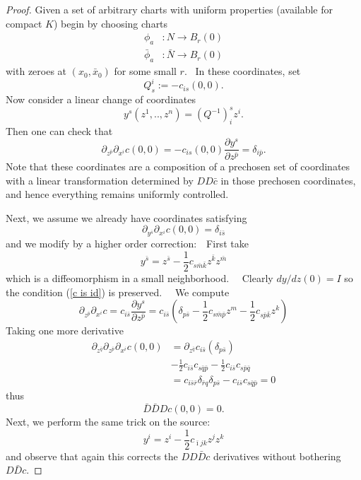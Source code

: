 \documentclass[12pt,letterpaper]{amsart}%
\numberwithin{mycounter}{section}
\theoremstyle{plain}
\numberwithin{equation}{section}
\theoremstyle{definition}
\begin{document}
\begin{proof}


Given a set of arbitrary charts with uniform properties (available for compact
$K$) begin by choosing charts
\begin{align*}
\phi_{a} &  :N\rightarrow B_{r}(0)\\
\bar{\phi}_{a} &  :\bar{N}\rightarrow B_{r}(0)
\end{align*}
with zeroes at $\left(  x_{0},\bar{x}_{0}\right)  $ for some small $r.$ \ In
these coordinates, set
\[
Q_{s}^{i}:=-c_{is}(0,0).
\]
Now consider a linear change of coordinates
\[
y^{s}(z^{1},..,z^{n})=\left(  Q^{-1}\right)  _{i}^{s}z^{i}.
\]
Then one can check that
\[
\partial_{z^{\bar{p}}}\partial_{x^{i}}c(0,0)=-c_{is}(0,0)\frac{\partial y^{s}%
}{\partial z^{\bar{p}}}=\delta_{i\bar{p}}.
\]
Note that these coordinates are a composition of a prechosen set of
coordinates with a linear transformation determined by $DD\bar{c}$ in those
prechosen coordinates, and hence everything remains uniformly controlled. 

Next, we assume we already have coordinates satisfying%
\begin{equation}
\partial_{y^{\bar{s}}}\partial_{x^{i}}c(0,0)=\delta_{i\bar{s}}\label{c is id}%
\end{equation}
and we modify by a higher order correction:\ \ First take
\[
y^{\bar{s}}=z^{\bar{s}}-\frac{1}{2}c_{s\bar{m}\bar{k}}z^{\bar{k}}z^{\bar{m}}%
\]
which is a diffeomorphism in a small neighborhood. \ \ Clearly $dy/dz(0)=I$ so
the condition (\ref{c is id}) is preserved. \ \ We compute
\[
\partial_{z^{\bar{p}}}\partial_{x^{i}}c=c_{i\bar{s}}\frac{\partial y^{s}%
}{\partial z^{\bar{p}}}=c_{i\bar{s}}\left(  \delta_{p\bar{s}}-\frac{1}%
{2}c_{s\bar{m}\bar{p}}z^{m}-\frac{1}{2}c_{s\bar{p}\bar{k}}z^{k}\right)
\]
Taking one more derivative%
\begin{align*}
\partial_{z^{\bar{q}}}\partial_{z^{\bar{p}}}\partial_{x^{i}}c(0,0) &
=\partial_{z^{\bar{q}}}c_{i\bar{s}}\left(  \delta_{p\bar{s}}\right)  \\
&  -\frac{1}{2}c_{i\bar{s}}c_{s\bar{q}\bar{p}}-\frac{1}{2}c_{i\bar{s}}%
c_{s\bar{p}\bar{q}}\\
&  =c_{i\bar{s}\bar{r}}\delta_{\bar{r}q}\delta_{p\bar{s}}-c_{i\bar{s}}%
c_{s\bar{q}\bar{p}}=0
\end{align*}
thus
\[
\bar{D}\bar{D}Dc(0,0)=0.
\]
Next, we perform the same trick on the source:\
\[
y^{i}=z^{i}-\frac{1}{2}c_{\bar{\imath}jk}z^{j}z^{k}%
\]
and observe that again this corrects the $DD\bar{D}c$ derivatives without
bothering $D\bar{D}c.$  
\end{proof}
\end{document}
